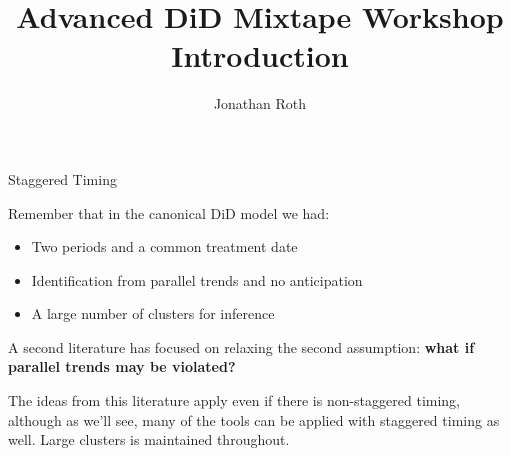 \documentclass[aspectratio = 169, 13pt]{beamer}
\author{Jonathan Roth}
\title[Advanced DiD Mixtape Workshop]{Advanced DiD Mixtape Workshop \\ Introduction}
\begin{document}


\begin{frame}{Staggered Timing}
	\begin{wideitemize}
		\item
		Remember that in the canonical DiD model we had:
		    
		\begin{itemize}
			\item 
			      Two periods and a common treatment date
			              
			\item
			      Identification from parallel trends and no anticipation
			              
			\item
			      A large number of clusters for inference
		\end{itemize}
		    
		\item
		A second literature has focused on relaxing the second assumption: \textbf{what if parallel trends may be violated?}
		    
		\item
		The ideas from this literature apply even if there is non-staggered timing, although as we'll see, many of the tools can be applied with staggered timing as well. Large clusters is maintained throughout. 
		    
	\end{wideitemize}
	
\end{frame}
\end{document}
